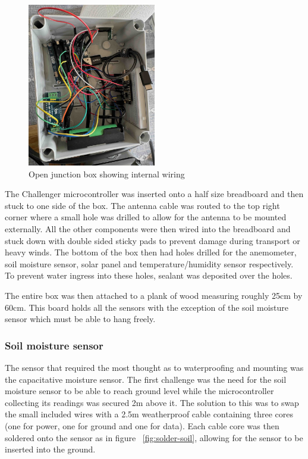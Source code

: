 \begin{figure}[H]
    \centering
    \includegraphics[width=0.5\textwidth]{contents/part-2/fig2/box-internals.jpeg}
    \caption{Open junction box showing internal wiring}
    \label{fig:box-internals}
\end{figure}

The Challenger microcontroller was inserted onto a half size breadboard and then
stuck to one side of the box. The antenna cable was routed to the top right
corner where a small hole was drilled to allow for the antenna to be mounted
externally. All the other components were then wired into the breadboard and
stuck down with double sided sticky pads to prevent damage during transport or
heavy winds. The bottom of the box then had holes drilled for the anemometer,
soil moisture sensor, solar panel and temperature/humidity sensor respectively.
To prevent water ingress into these holes, sealant was deposited over the holes.

The entire box was then attached to a plank of wood measuring roughly 25cm by
60cm. This board holds all the sensors with the exception of the soil moisture
sensor which must be able to hang freely.

\subsubsection{Soil moisture sensor}

The sensor that required the most thought as to waterproofing and mounting was
the capacitative moisture sensor. The first challenge was the need for the soil
moisture sensor to be able to reach ground level while the microcontroller
collecting its readings was secured 2m above it. The solution to this was to
swap the small included wires with a 2.5m weatherproof cable containing three
cores (one for power, one for ground and one for data). Each cable core was then
soldered onto the sensor as in figure ~\ref{fig:solder-soil}, allowing for the
sensor to be inserted into the ground.

